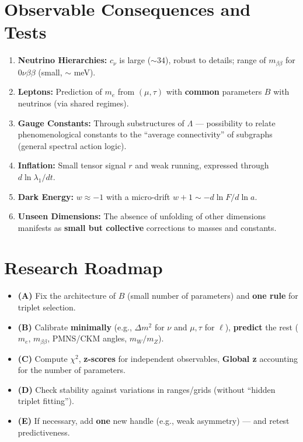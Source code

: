 \documentclass[12pt,a4paper]{article}
\begin{document}
\section{Observable Consequences and Tests}

\begin{enumerate}
    \item \textbf{Neutrino Hierarchies:} \(c_\nu\) is large (\(\sim 34\)), robust to details; range of \(m_{\beta\beta}\) for \(0\nu\beta\beta\) (small, \(\sim\) meV).
    \item \textbf{Leptons:} Prediction of \(m_e\) from \((\mu, \tau)\) with \textbf{common} parameters \(B\) with neutrinos (via shared regimes).
    \item \textbf{Gauge Constants:} Through substructures of \(\Lambda\) — possibility to relate phenomenological constants to the ``average connectivity'' of subgraphs (general spectral action logic).
    \item \textbf{Inflation:} Small tensor signal \(r\) and weak running, expressed through \(d \ln \lambda_1 / dt\).
    \item \textbf{Dark Energy:} \(w \approx -1\) with a micro-drift \(w + 1 \sim -d \ln F / d \ln a\).
    \item \textbf{Unseen Dimensions:} The absence of unfolding of other dimensions manifests as \textbf{small but collective} corrections to masses and constants.
\end{enumerate}

\section{Research Roadmap}

\begin{itemize}
    \item \textbf{(A)} Fix the architecture of \(B\) (small number of parameters) and \textbf{one rule} for triplet selection.
    \item \textbf{(B)} Calibrate \textbf{minimally} (e.g., \(\Delta m^2\) for \(\nu\) and \(\mu, \tau\) for \(\ell\)), \textbf{predict} the rest (\(m_e\), \(m_{\beta\beta}\), PMNS/CKM angles, \(m_W/m_Z\)).
    \item \textbf{(C)} Compute \(\chi^2\), \textbf{z-scores} for independent observables, \textbf{Global z} accounting for the number of parameters.
    \item \textbf{(D)} Check stability against variations in ranges/grids (without ``hidden triplet fitting'').
    \item \textbf{(E)} If necessary, add \textbf{one} new handle (e.g., weak asymmetry) — and retest predictiveness.
\end{itemize}
\end{document}
